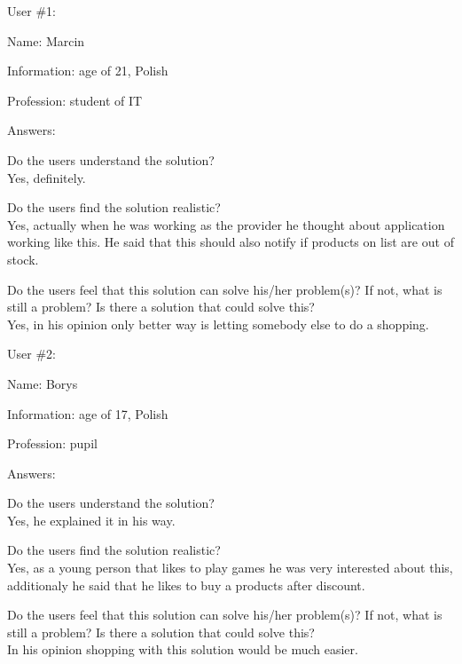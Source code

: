 \documentclass[a4paper,10pt,oneside]{scrreprt}
\begin{document}
User \#1:
\begin{compactitem}
	\item Name: Marcin
	\item Information: age of 21, Polish
	\item Profession: student of IT
\end{compactitem}
\bigskip
Answers:
\begin{compactitem}
	\item Do the users understand the solution?\\
	Yes, definitely.
	
	\item Do the users find the solution realistic?\\
	Yes, actually when he was working as the provider he thought about application working like this. He said that this should also notify if products on list are out of stock.\\
	
	\item Do the users feel that this solution can solve his/her problem(s)? If not, what is still
	a problem? Is there a solution that could solve this?\\
	Yes, in his opinion only better way is letting somebody else to do a shopping.
\end{compactitem}
\bigskip
User \#2:
\begin{compactitem}
	\item Name: Borys
	\item Information: age of 17, Polish
	\item Profession: pupil
\end{compactitem}
\bigskip
Answers:
\begin{compactitem}
	\item Do the users understand the solution?\\
	Yes, he explained it in his way.
	
	\item Do the users find the solution realistic?\\
	Yes, as a young person that likes to play games he was very interested about this, additionaly he said that he likes to buy a products after discount.\\
	
	\item Do the users feel that this solution can solve his/her problem(s)? If not, what is still
	a problem? Is there a solution that could solve this?\\
	In his opinion shopping with this solution would be much easier.\\
\end{compactitem}
\end{document}

